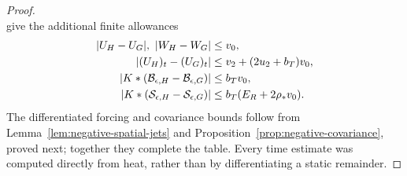 \begin{proof}
\[\]
give the additional finite allowances
\begin{align}
 |U_H-U_G|,\ |W_H-W_G|&\le v_0,\notag\\
 |(U_H)_t-(U_G)_t|&\le v_2+(2u_2+b_T)v_0,\notag\\
 |K*(\mathcal B_{\epsilon,H}-\mathcal B_{\epsilon,G})|
 &\le b_Tv_0,\notag\\
 |K*(\mathcal S_{\epsilon,H}-\mathcal S_{\epsilon,G})|
 &\le b_T(E_R+2\rho_*v_0).
 \label{eq:negative-potential-budgets}
\end{align}
The differentiated forcing and covariance bounds follow from
Lemma~\ref{lem:negative-spatial-jets} and
Proposition~\ref{prop:negative-covariance}, proved next; together they
complete the table. Every time estimate was computed directly from heat,
rather than by differentiating a static remainder.
\end{proof}

